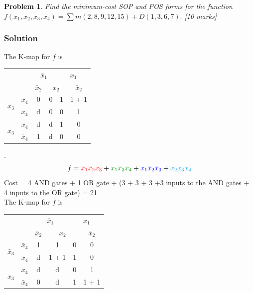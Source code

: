 \documentclass{article}
\newtheorem{prob}{Problem}
\newcommand{\bx}{\bar{x}}
\newcommand{\cred}{\color{red}}
\newcommand{\cg}{\color{green!60!black}}
\newcommand{\cb}{\color{blue}}
\begin{document}
\begin{prob}
Find the minimum-cost SOP and POS forms for the function $f(x_1 , x_2 , x_3, x_4) =
\sum m(2, 8, 9, 12, 15) + D(1, 3, 6, 7).$ \cite[Prob
2.40]{brown2013fundamentals} [10 marks]
\end{prob}

\subsubsection*{Solution}

The K-map for $f$ is
\\
\begin{tabular}{c|c|c|c|c|c}
  \toprule
  && \multicolumn{2}{c|}{$\bx_1$} & \multicolumn{2}{c}{$x_1$}
  \\
  && $\bx_2$ & \multicolumn{2}{c|}{$x_2$} & $\bx_2$
  \\ \midrule
  \multirow{2}{*}{$\bx_3$} & $\bx_4$
                                  & 0 & 0 & \cg 1 & \cg 1 + \cb 1
  \\
  & $x_4$
                                  & d & 0 & 0 & \cb 1
  \\
  \multirow{2}{*}{$x_3$}   &  $x_4$
                                  & \cred d & \color{cyan} d & \color{cyan} 1 & 0
  \\
  & $\bx_4$
                                  & \cred 1 & d & 0 & 0
  \\\bottomrule
\end{tabular}.
\\
\[ f = { \cred \bx_1 \bx_2 x_3} +  { \cg x_1 \bx_3 \bx_4 } + {\cb x_1 \bx_2 \bx_3 }
  + { \color{cyan} x_2 x_3 x_4 }
\]
  Cost = 4 AND gates + 1 OR gate + (3 + 3 + 3 +3 inputs to the AND gates + 4
  inputs to the OR gate) = 21
  \\
The K-map for $\bar{f}$ is
\\
\begin{tabular}{c|c|c|c|c|c}
  \toprule
  && \multicolumn{2}{c|}{$\bx_1$} & \multicolumn{2}{c}{$x_1$}
  \\
  && $\bx_2$ & \multicolumn{2}{c|}{$x_2$} & $\bx_2$
  \\ \midrule
  \multirow{2}{*}{$\bx_3$} & $\bx_4$
                                  & \cred 1 & \cred 1 & 0 & 0
  \\
  & $x_4$
                                  & \cred d & \cred 1 + \cb  1 & \cb 1 & 0
  \\
  \multirow{2}{*}{$x_3$}   &  $x_4$
                                  & d & d & 0 & \color{cyan} 1
  \\
  & $\bx_4$
                                  & 0 & d & \cg 1 & \cg 1 +  \color{cyan} 1
  \\\bottomrule
\end{tabular}
\end{document}
